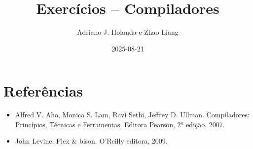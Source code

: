 \documentclass[11pt]{article}
\begin{document}
\title{Exercícios -- Compiladores}
\author{Adriano J. Holanda e Zhao Liang}
\date{2025-08-21}
\maketitle

%


\section*{Referências}
\begin{itemize}
\item Alfred V. Aho, Monica S. Lam, Ravi Sethi, Jeffrey
  D. Ullman. Compiladores: Princípios, Técnicas e Ferramentas. Editora
  Pearson, 2$^a$ edição, 2007.
\item John Levine. Flex \& bison. O'Reilly editora, 2009.
\end{itemize}
\end{document}
